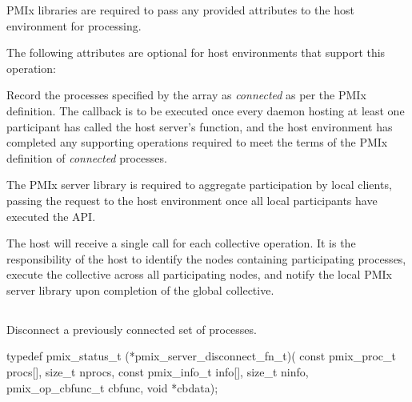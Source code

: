 \reqattrstart
\ac{PMIx} libraries are required to pass any provided attributes to the host environment for processing.
\reqattrend

\optattrstart
The following attributes are optional for host environments that support this operation:


\optattrend

\descr

Record the processes specified by the  array as \textit{connected} as per the \ac{PMIx} definition. The callback is to be executed once every daemon hosting at least one participant has called the host server's  function, and the host environment has completed any supporting operations required to meet the terms of the \ac{PMIx} definition of \textit{connected} processes.

\adviceimplstart
The \ac{PMIx} server library is required to aggregate participation by local clients, passing the request to the host environment once all local participants have executed the \ac{API}.
\adviceimplend

\advicermstart
The host will receive a single call for each collective operation. It is the responsibility of the host to identify the nodes containing participating processes, execute the collective across all participating nodes, and notify the local \ac{PMIx} server library upon completion of the global collective.
\advicermend


\subsection{}

\summary

Disconnect a previously connected set of processes.

\format

\cspecificstart
\begin{codepar}
typedef pmix_status_t (*pmix_server_disconnect_fn_t)(
                             const pmix_proc_t procs[],
                             size_t nprocs,
                             const pmix_info_t info[],
                             size_t ninfo,
                             pmix_op_cbfunc_t cbfunc,
                             void *cbdata);
\end{codepar}
\cspecificend

